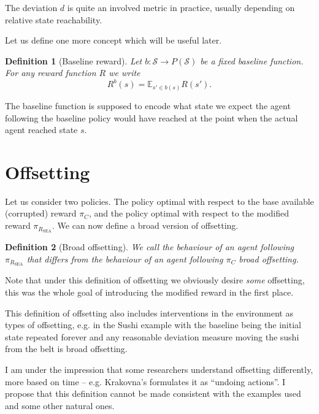 \documentclass{article}
\newtheorem{definition}{Definition}
\newcommand{\stateSpace}{\mathcal{S}}
\newcommand{\rewardFunction}{R}
\newcommand{\modifiedRewardFunction}{\rewardFunction_{\mathrm{SEA}}}
\newcommand{\corruption}{C}
\newcommand{\deviationFromBaseline}{d}
\newcommand{\baseline}{b}
\begin{document}
	The deviation $\deviationFromBaseline$ is quite an involved metric in practice,
	usually depending on	relative state	reachability.

	Let us define one more concept which will be useful later.

	\begin{definition}[Baseline reward]
		Let $\baseline \colon \stateSpace \to P\left( \stateSpace \right)$ be a fixed baseline function.
		For any reward function $\rewardFunction$ we write
		\begin{equation*}
			\rewardFunction^\baseline\left( s \right) =
			\mathbb{E}_{s' \in \baseline\left( s \right)} \rewardFunction\left( s' \right).
		\end{equation*}
		\label{def:baselineReward}
	\end{definition}
	The baseline function is supposed to encode what state we expect the agent following
	the baseline policy would have reached at the point when the actual agent reached state $s$.

\section{Offsetting}

	Let us consider two policies. The policy optimal with respect to the base available
	(corrupted) reward $\pi_\corruption$, and the policy optimal with respect to the modified
	reward $\pi_{\modifiedRewardFunction}$.
	We can now define a broad version of offsetting.
	\begin{definition}[Broad offsetting]
		We call the behaviour of an agent following $\pi_{\modifiedRewardFunction}$ that differs
		from the behaviour of an agent following $\pi_\corruption$ \emph{broad offsetting}.
		\label{def:broadOffsetting}
	\end{definition}
	Note that under this definition of offsetting we obviously desire \emph{some} offsetting,
	this was the whole goal of introducing the modified reward in the first place.

	This definition of offsetting also includes interventions in the environment as types
	of offsetting, e.g. in the Sushi example with the baseline being the initial state repeated
	forever and any reasonable deviation measure moving the sushi from the belt is broad offsetting.

	I am under the impression that some researchers understand offsetting differently,
	more based on time -- e.g. Krakovna's formulates it as ``undoing actions''.
	I propose that this definition cannot be made consistent with the examples used
	and some other natural ones.
\end{document}

